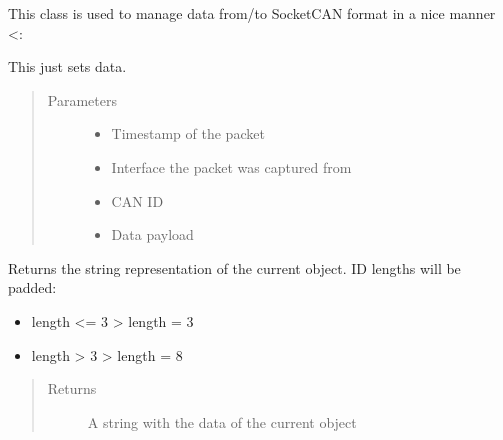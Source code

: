 \documentclass[letterpaper,10pt,english]{sphinxmanual}
\begin{document}
\begin{fulllineitems}
\label{\detokenize{src:src.CANData.SocketCANPacket}}
This class is used to manage data from/to SocketCAN format in a nice manner \textless{}:

\begin{fulllineitems}
\label{\detokenize{src:src.CANData.SocketCANPacket.__init__}}
This just sets data.
\begin{quote}\begin{description}
\item[{Parameters}] \leavevmode\begin{itemize}
\item {} 
 \textendash{} Timestamp of the packet

\item {} 
 \textendash{} Interface the packet was captured from

\item {} 
 \textendash{} CAN ID

\item {} 
 \textendash{} Data payload

\end{itemize}

\end{description}\end{quote}

\end{fulllineitems}


\begin{fulllineitems}
\label{\detokenize{src:src.CANData.SocketCANPacket.toString}}
Returns the string representation of the current object.
ID lengths will be padded:
\begin{itemize}
\item {} 
length \textless{}= 3 \textendash{}\textgreater{} length = 3

\item {} 
length \textgreater{} 3 \textendash{}\textgreater{} length = 8

\end{itemize}
\begin{quote}\begin{description}
\item[{Returns}] \leavevmode
A string with the data of the current object

\end{description}\end{quote}

\end{fulllineitems}


\end{fulllineitems}
\end{document}

